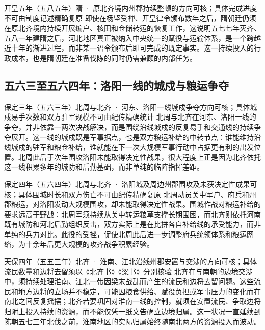 \begin{event}{}{开皇五年（五八五年）}{隋 · 原北齐境内州郡}{持续整顿的方向可核；具体完成进度不可由制度记述精确复原}
即使在杨坚受禅、开皇律令颁布数年之后，隋朝廷仍须在原北齐境内持续开展编户、核田和仓储转运的恢复工作，这说明五七七年灭齐、五八一年建隋之后，河北地区真正被纳入中央统一的赋役与运输体系，是一个跨越近十年的渐进过程，而非某一诏令颁布后即可完成的既定事实。这一持续投入的行政成本，也是隋朝廷在准备伐陈的同时仍需兼顾的内部任务。
\end{event}

\subsection{五六三至五六四年：洛阳一线的城戍与粮运争夺}

\begin{event}{}{保定三年（五六三年）}{北周与北齐 · 河东、洛阳一线城戍}{争夺方向可核；具体城戍易手次数和双方驻军规模不可由纪传精确统计}
北周与北齐在河东、洛阳一线的争夺，并非依靠一两次决战解决，而是围绕沿线城戍的反复易手和交通线的持续争夺展开。这一线的城戍既是军事据点，也是双方粮运补给的中转节点：谁能维持沿线城戍的驻军和粮仓补给，谁就能在下一次大规模军事行动中占据更有利的出发位置。北周此后于次年围攻洛阳未能取得决定性战果，很大程度上正是因为北齐依托这一线积累多年的城防和后勤基础，而非单纯的临阵指挥差距。
\end{event}

\begin{event}{}{保定四年（五六四年）}{北周与北齐 · 洛阳城及周边州郡}{围攻及未获决定性成果可核；具体围城时长和双方伤亡不可由纪传精确复原}
北周动员关中军户、府兵和州郡粮运，对洛阳发动大规模围攻，却未能取得决定性战果。围城作战对粮运补给的要求远高于野战：北周军须持续从关中转运粮草支撑长期围困，而北齐则依托河南既有城防和河北后勤组织反击，双方实际上是在比拼各自补给线的承受能力，而非单纯的兵力对比。此役的受挫，促使北周此后进一步调整府兵统领体系和粮运网络，为十余年后更大规模的攻齐战争积累经验。
\end{event}

\begin{event}{}{天保四年（五五三年）}{北齐 · 淮南、江北沿线州郡}{安置与交涉的方向可核；具体流民数量和边将去留须以《北齐书》《梁书》分别核验}
北齐在与南朝的边境交涉中，须持续处理淮南、江北一带因梁末战乱而产生的流民和边将去留问题。这些流民和地方边将的立场并不稳定，可能因粮食供给、赋役负担或军事压力的变化而在南北之间反复摇摆；北齐若要巩固对淮南一线的控制，就须在安置流民、争取边将归附上投入持续的资源，而不能仅凭一纸文告确立边境归属。这一状况一直延续到陈朝五七三年北伐之前，淮南地区的实际归属始终随南北两方的资源投入而波动。
\end{event}

